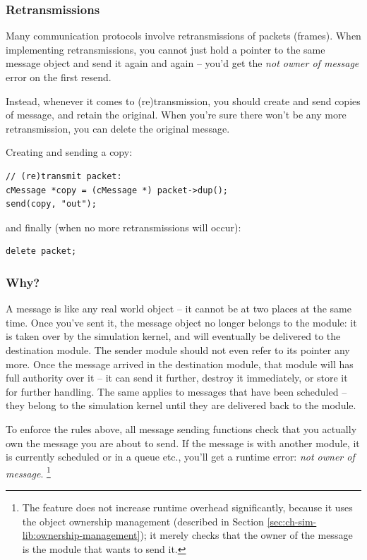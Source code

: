 \subsubsection{Retransmissions}

Many communication protocols involve retransmissions of packets (frames).
When implementing retransmissions, you cannot just hold a pointer
to the same message object and send it again and again -- you'd get
the \textit{not owner of message} error on the first resend.

Instead, whenever it comes to (re)transmission, you should create and
send copies of message, and retain the original.
When you're sure there won't be any more retransmission,
you can delete the original message.

Creating and sending a copy:

\begin{verbatim}
// (re)transmit packet:
cMessage *copy = (cMessage *) packet->dup();
send(copy, "out");
\end{verbatim}

and finally (when no more retransmissions will occur):

\begin{verbatim}
delete packet;
\end{verbatim}


\subsubsection{Why?}

A message is like any real world object -- it cannot be at two places
at the same time. Once you've sent it, the message object
no longer belongs to the module: it is taken over by the simulation kernel,
and will eventually be delivered to the destination module.
The sender module should not even refer to its pointer any more.
Once the message arrived in the destination module, that module
will has full authority over it -- it can send it further,
destroy it immediately, or store it for further handling.
The same applies to messages that have been scheduled -- they
belong to the simulation kernel until they are delivered back to
the module.

To enforce the rules above, all message sending functions
check that you actually own the message you are about to send.
If the message is with another module, it is currently scheduled or
in a queue etc., you'll get a runtime error: \textit{not owner of message}.
  \footnote{The feature does not increase runtime overhead significantly, because
  it uses the object ownership management (described in
  Section \ref{sec:ch-sim-lib:ownership-management});
  it merely checks that the owner of the message is the module that
  wants to send it.}



